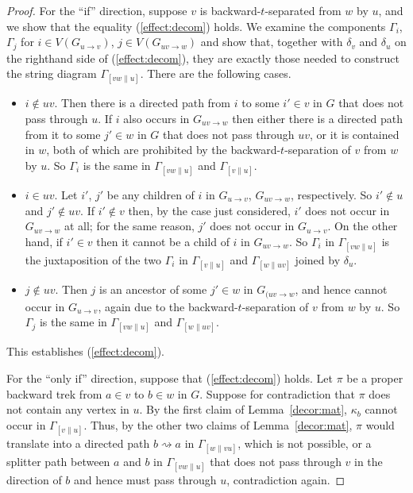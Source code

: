 \documentclass[12pt]{amsart}
\theoremstyle{plain}
\theoremstyle{definition}
\theoremstyle{remark}
\numberwithin{equation}{section}
\theoremstyle{plain}
\newcommand{\0}{\emptyset}
\newcommand{\stri}{\Gamma}
\begin{document}
\begin{proof}
For the ``if'' direction, suppose $v$ is backward-$t$-separated from $w$ by $u$, and we show that the equality (\ref{effect:decom}) holds. We examine the components $\stri_i$, $\stri_j$ for $i \in V(G_{u \rightarrow v})$, $j \in V(G_{uv \rightarrow w})$ and show that, together with $\delta_{v}$ and $\delta_{u}$ on the righthand side of (\ref{effect:decom}), they are exactly those needed to construct the string diagram $\stri_{[vw \| u]}$. There are the following cases.
\begin{itemize}
  \item $i \notin uv$. Then there is a directed path from $i$ to some $i' \in v$ in $G$ that does not pass through $u$. If $i$ also occurs in $G_{uv \rightarrow w}$ then either there is a directed path from it to some $j' \in w$ in $G$ that does not pass through $uv$, or it is contained in $w$, both of which are prohibited by the backward-$t$-separation of $v$ from $w$ by $u$. So  $\stri_i$ is the same in $\stri_{[vw \| u]}$ and $\stri_{[v \| u]}$.
  \item $i \in uv$. Let $i'$, $j'$ be any children of $i$ in $G_{u \rightarrow v}$, $G_{uv \rightarrow w}$, respectively. So $i' \notin u$ and $j' \notin uv$. If $i' \notin v$ then, by the case just considered, $i'$ does not occur in $G_{uv \rightarrow w}$ at all; for the same reason, $j'$ does not occur in $G_{u \rightarrow v}$. On the other hand, if $i' \in v$ then it cannot be a child  of $i$ in $G_{uv \rightarrow w}$. So $\stri_i$ in $\stri_{[vw \| u]}$ is the juxtaposition of  the two $\stri_i$ in $\stri_{[v \| u]}$ and $\stri_{[w \| uv]}$ joined by $\delta_{u}$.
  \item $j \notin uv$. Then $j$ is an ancestor of some $j' \in w$ in $G_{(uv \rightarrow w}$, and hence cannot occur in $G_{u \rightarrow v}$, again due to the backward-$t$-separation of $v$ from $w$ by $u$. So $\stri_j$ is the same in $\stri_{[vw \| u]}$ and $\stri_{[w \| uv]}$.
\end{itemize}
This establishes (\ref{effect:decom}).

For the ``only if'' direction, suppose that (\ref{effect:decom}) holds. Let $\pi$ be a proper backward trek from $a \in v$ to $b \in w$ in $G$. Suppose for contradiction that $\pi$ does not contain any vertex in $u$. By the first claim of Lemma~\ref{decor:mat},  $\kappa_b$ cannot occur  in $\stri_{[v \| u]}$. Thus, by the other two claims of Lemma~\ref{decor:mat}, $\pi$  would translate into  a directed path $b \rightsquigarrow a$ in $\stri_{[w \| v u]}$, which is not possible, or a splitter path between  $a$ and $b$ in $\stri_{[vw \| u]}$ that does not pass  through $v$ in the direction of $b$ and hence must pass through $u$, contradiction again.
\end{proof}
\end{document}
